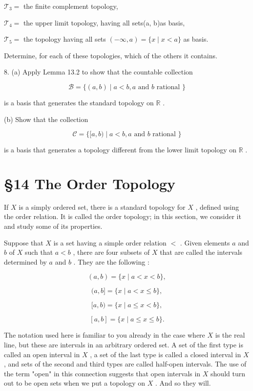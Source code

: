 \({\mathcal{T}}_{3} =\) the finite complement topology,

\({\mathcal{T}}_{4} =\) the upper limit topology, having all sets(a, b)as basis,

\({\mathcal{T}}_{5} =\) the topology having all sets \(\left( {-\infty ,a}\right)  = \{ x \mid  x < a\}\) as basis.

Determine, for each of these topologies, which of the others it contains.

8. (a) Apply Lemma 13.2 to show that the countable collection

\[
\mathcal{B} = \{ \left( {a,b}\right)  \mid  a < b,a\text{ and }b\text{ rational }\}
\]

is a basis that generates the standard topology on \(\mathbb{R}\) .

(b) Show that the collection

\[
\mathcal{C} = \{ \lbrack a,b) \mid  a < b,a\text{ and }b\text{ rational }\}
\]

is a basis that generates a topology different from the lower limit topology on \(\mathbb{R}\) .

\section*{§14 The Order Topology}

If \(X\) is a simply ordered set, there is a standard topology for \(X\) , defined using the order relation. It is called the order topology; in this section, we consider it and study some of its properties.

Suppose that \(X\) is a set having a simple order relation \(<\) . Given elements \(a\) and \(b\) of \(X\) such that \(a < b\) , there are four subsets of \(X\) that are called the intervals determined by \(a\) and \(b\) . They are the following :

\[
\left( {a,b}\right)  = \{ x \mid  a < x < b\} ,
\]

\[
(a,b\rbrack  = \{ x \mid  a < x \leq  b\} ,
\]

\[
\lbrack a,b) = \{ x \mid  a \leq  x < b\} ,
\]

\[
\left\lbrack  {a,b}\right\rbrack   = \{ x \mid  a \leq  x \leq  b\} .
\]

The notation used here is familiar to you already in the case where \(X\) is the real line, but these are intervals in an arbitrary ordered set. A set of the first type is called an open interval in \(X\) , a set of the last type is called a closed interval in \(X\) , and sets of the second and third types are called half-open intervals. The use of the term "open" in this connection suggests that open intervals in \(X\) should turn out to be open sets when we put a topology on \(X\) . And so they will.

